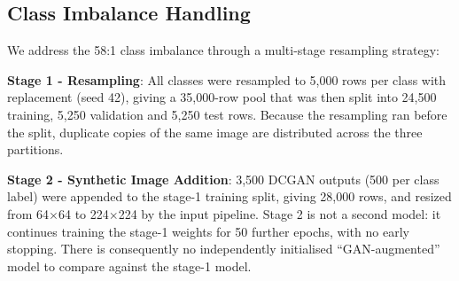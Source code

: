 \documentclass[ai,article,submit,pdftex,moreauthors]{Definitions/mdpi}
\begin{document}

\subsection{Class Imbalance Handling}

We address the 58:1 class imbalance through a multi-stage resampling strategy:

\textbf{Stage 1 - Resampling}: All classes were resampled to 5,000 rows per class with replacement (seed 42), giving a 35,000-row pool that was then split into 24,500 training, 5,250 validation and 5,250 test rows. Because the resampling ran before the split, duplicate copies of the same image are distributed across the three partitions.

\textbf{Stage 2 - Synthetic Image Addition}: 3,500 DCGAN outputs (500 per class label) were appended to the stage-1 training split, giving 28,000 rows, and resized from 64$\times$64 to 224$\times$224 by the input pipeline. Stage 2 is not a second model: it continues training the stage-1 weights for 50 further epochs, with no early stopping. There is consequently no independently initialised ``GAN-augmented'' model to compare against the stage-1 model.
\end{document}
